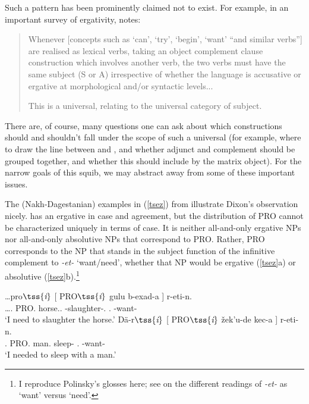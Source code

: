 \documentclass[output=paper]{langsci/langscibook}
\begin{document}
\ea \label{abscntr} 	\nobreak\begin{xlista}
	\end{xlista}
\z

Such a pattern has been prominently claimed not to exist. For example, in an
important survey of ergativity, \citet[134--135]{Dixon1994} notes:

\begin{quote} Whenever [concepts such as `can', `try', `begin', `want' ``and
    similar verbs''] are realised as lexical verbs, taking an object complement
    clause construction which involves another verb, the two verbs must have
    the same subject (S or A) irrespective of whether the language is
    accusative or ergative at morphological and/or syntactic levels...

    This is a universal, relating to the universal category of subject.
\end{quote}

There are, of course, many questions one can ask about which constructions
should and shouldn't fall under the scope of such a universal (for example,
where to draw the line between  and , and whether adjunct 
and complement  should be grouped together, and whether this should
include  by the matrix object). For the narrow goals of this squib, we
may abstract away from some of these important issues.

The  (Nakh-Dagestanian) examples in (\ref{tsez}) from
\cite[319]{polinsky16} illustrate Dixon's observation nicely.  has an
ergative  in case and agreement, but the distribution of PRO{} cannot
be characterized uniquely in terms of case. It is neither all-and-only
ergative
NPs nor all-and-only absolutive NPs that correspond to PRO. Rather, PRO
corresponds to the NP that stands in the subject function of the infinitive
complement to \emph{-et-} `want/need', whether that NP would be
ergative
(\ref{tsez}a) or absolutive (\ref{tsez}b).\footnote{I reproduce Polinsky's
glosses here; see \citet[319]{polinsky16} on the different readings of
\emph{-et-} as `want' versus `need'.}

\ea \label{tsez} 
	\begin{xlista}
	\ex \gll \ldots pro$\tss{\emph{i}}$ [ PRO$\tss{\emph{i}}$ gulu b-exad-a ] r-eti-n.\\
	\ldots \Fsg.\Lat{} {} PRO.\Erg{} horse.\Abs.\Iii{} \Iii{}-slaughter-.\Inf{} {}.\Iv{} \Iv{}-want-\Nw{}\\
	\glt `I need to slaughter the horse.'
	\ex \gll D\"a-r$\tss{\emph{i}}$ [ PRO$\tss{\emph{i}}$ \v{z}ek'u-de kec-a ] r-eti-n.\\
	\Fsg.\Lat{} {} PRO.\Abs{} man.\Apud{} sleep-\Inf{} {}.\Iv{} \Iv{}-want-\Nw{} \\
	\glt `I needed to sleep with a man.'
	\end{xlista}
\z
\end{document}
